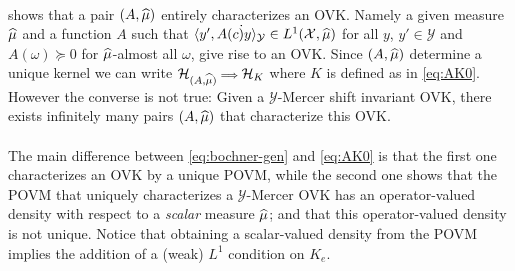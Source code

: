\documentclass[twoside,11pt]{article}
\begin{document}
\paragraph{}
 shows that a pair $(A,\widehat{\mu})$ entirely
characterizes an \acs{OVK}. Namely a given measure $\widehat{\mu}$ and a function
$A$ such that $\langle y', A(c\dot)y\rangle_{\mathcal{Y}}\in
L^1(\mathcal{X},\widehat{\mu})$ for all $y$, $y'\in\mathcal{Y}$ and
$A(\omega)\succcurlyeq 0$ for $\widehat{\mu}$-almost all $\omega$, give rise to an
\acs{OVK}. Since $(A,\widehat{\mu})$ determine a unique kernel we can write
$\mathcal{H}_{(A,\widehat{\mu})}{\scriptstyle\implies}\mathcal{H}_K$ where $K$ is
defined as in \cref{eq:AK0}. However the converse is not true: Given a
$\mathcal{Y}$-Mercer shift invariant \acl{OVK}, there exists infinitely many
pairs $(A,\widehat{\mu})$ that characterize this \acs{OVK}.
\paragraph{}
The main difference between \cref{eq:bochner-gen} and
\cref{eq:AK0} is that the first one characterizes an \acs{OVK}
by a unique \acf{POVM}, while the second one shows that the \acs{POVM} that
uniquely characterizes a $\mathcal{Y}$-Mercer \acs{OVK} has an operator-valued
density with respect to a \emph{scalar} measure $\widehat{\mu}$; and that this
operator-valued density is not unique. Notice that obtaining a scalar-valued
density from the \acs{POVM} implies the addition of a (weak) $L^1$ condition on
$K_e$.
\end{document}
